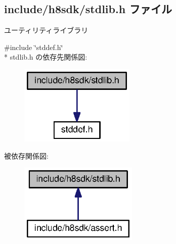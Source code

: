 \subsection{include/h8sdk/stdlib.h ファイル}
\label{stdlib_8h}


ユーティリティライブラリ  


{\ttfamily \#include \char`\"{}stddef.\+h\char`\"{}}\\*
stdlib.\+h の依存先関係図\+:
\nopagebreak
\begin{figure}[H]
\begin{center}
\leavevmode
\includegraphics[width=156pt]{d0/de4/stdlib_8h__incl}
\end{center}
\end{figure}
被依存関係図\+:
\nopagebreak
\begin{figure}[H]
\begin{center}
\leavevmode
\includegraphics[width=160pt]{da/d24/stdlib_8h__dep__incl}
\end{center}
\end{figure}
